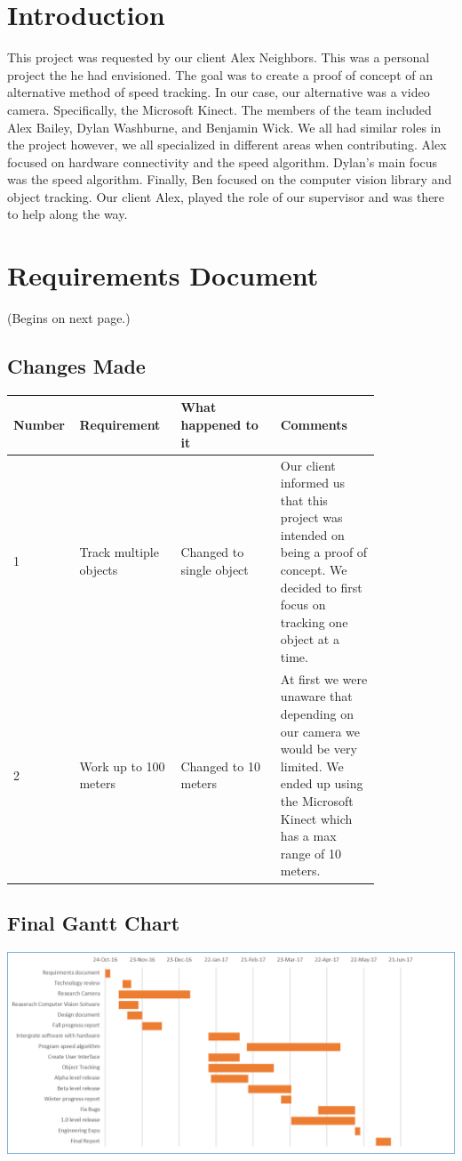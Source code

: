 \documentclass[onecolumn, draftclsnofoot,10pt, compsoc]{IEEEtran}
\begin{document}
\section{Introduction}
This project was requested by our client Alex Neighbors.
This was a personal project the he had envisioned.
The goal was to create a proof of concept of an alternative method of speed tracking.
In our case, our alternative was a video camera. Specifically, the Microsoft Kinect.
The members of the team included Alex Bailey, Dylan Washburne, and Benjamin Wick.
We all had similar roles in the project however, we all specialized in different areas when contributing. Alex focused on hardware connectivity and the speed algorithm. Dylan's main focus was the speed algorithm. Finally, Ben focused on the computer vision library and object tracking.
Our client Alex, played the role of our supervisor and was there to help along the way.

\newpage

\section{Requirements Document}
(Begins on next page.)
\newpage



\subsection{Changes Made}
\begin{tabular}{|p{0.075\linewidth} |p{0.25\linewidth}|p{0.25\linewidth}|p{0.25\linewidth}|}
\hline 
Number & Requirement & What happened to it & Comments \\
\hline 
1 & Track multiple objects & Changed to single object & Our client informed us that this project was intended on being a proof of concept. We decided to first focus on tracking one object at a time. \\
\hline
2 & Work up to 100 meters & Changed to 10 meters & At first we were unaware that depending on our camera we would be very limited. We ended up using the Microsoft Kinect which has a max range of 10 meters. \\
\hline
\end{tabular}
\subsection{Final Gantt Chart}
\includegraphics[scale=.80]{gantt2}
\end{document}
